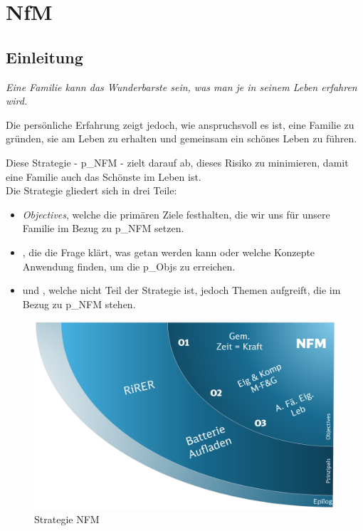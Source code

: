 \chapter{NfM}
\setcounter{section}{0}

\section{Einleitung}
\begin{center}
	\textit{Eine Familie kann das Wunderbarste sein, was man je in seinem Leben erfahren wird.}
\end{center}

Die persönliche Erfahrung zeigt jedoch, wie anspruchsvoll es ist, eine Familie zu gründen, sie am Leben zu erhalten und gemeinsam ein schönes Leben zu führen.

Diese Strategie - \gls{p_NFM} - zielt darauf ab, dieses Risiko zu minimieren, damit eine Familie auch das Schönste im Leben ist.\\

Die Strategie gliedert sich in drei Teile:
\begin{itemize}
	\item \textit{Objectives}, welche die primären Ziele festhalten, die wir uns für unsere Familie im Bezug zu \gls{p_NFM} setzen.
	\item \textit{}, die die Frage klärt, was getan werden kann oder welche Konzepte Anwendung finden, um die \glspl{p_Obj} zu erreichen.
	\item und \textit{}, welche nicht Teil der Strategie ist, jedoch Themen aufgreift, die im Bezug zu \gls{p_NFM} stehen.
\end{itemize}

\begin{figure}[H]
	\centering
	\includegraphics[scale = 0.2]{attachment/chapter_OWN/Scc007.png}
	\caption{Strategie NFM}
\end{figure} 


